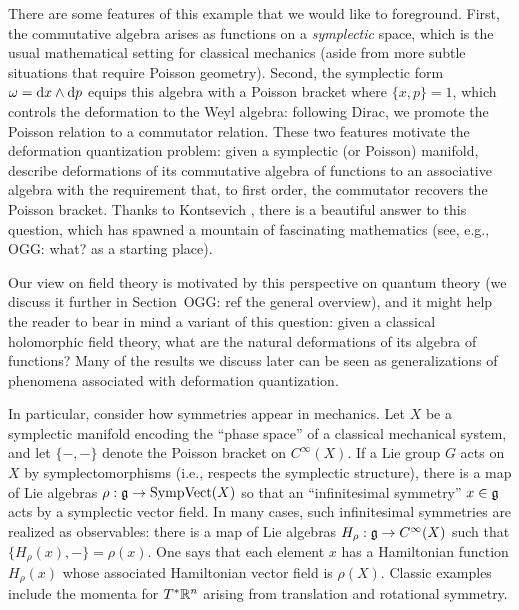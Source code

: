\documentclass[11pt]{amsart}
\def\owen#1{{\textcolor{green!65!black}{OGG: {#1}}}}
\begin{document}
There are some features of this example that we would like to foreground. 
First, the commutative algebra arises as functions on a {\em symplectic} space,
which is the usual mathematical setting for classical mechanics (aside from more subtle situations that require Poisson geometry).
Second, the symplectic form $\omega = {\rm d} x \wedge {\rm d} p$ equips this algebra 
with a Poisson bracket where $\{ x, p \} = 1$,
which controls the deformation to the Weyl algebra: following Dirac, we promote the Poisson relation to a commutator relation.
These two features motivate the deformation quantization problem: 
given a symplectic (or Poisson) manifold,
describe deformations of its commutative algebra of functions to an associative algebra with the requirement that, to first order,  the commutator recovers the Poisson bracket.
Thanks to Kontsevich \cite{KonDQ}, there is a beautiful answer to this question, which has spawned a mountain of fascinating mathematics (see, e.g., \owen{what?} as a starting place).

Our view on field theory is motivated by this perspective on quantum theory (we discuss it further in Section~\owen{ref the general overview}), 
and it might help the reader to bear in mind a variant of this question:
given a classical holomorphic field theory, what are the natural deformations of its algebra of functions?
Many of the results we discuss later can be seen as generalizations of phenomena associated with deformation quantization.

In particular, consider how symmetries appear in mechanics.
Let $X$ be a symplectic manifold encoding the ``phase space'' of a classical mechanical system,
and let $\{-,-\}$ denote the Poisson bracket on $C^\infty(X)$.
If a Lie group $G$ acts on $X$ by symplectomorphisms (i.e., respects the symplectic structure),
there is a map of Lie algebras $\rho: \mathfrak g \to {\rm SympVect}(X)$ so that an ``infinitesimal symmetry'' $x \in \mathfrak g$ acts by a symplectic vector field.
In many cases, such infinitesimal symmetries are realized as observables: 
there is a map of Lie algebras $H_\rho: \mathfrak g \to C^\infty(X)$ such that $\{ H_\rho(x), - \} = \rho(x)$.
One says that each element $x$ has a Hamiltonian function $H_\rho(x)$ whose associated Hamiltonian vector field is $\rho(X)$.
Classic examples include the momenta for $T^* \mathbb R^n$ arising from translation and rotational symmetry.
\end{document}
